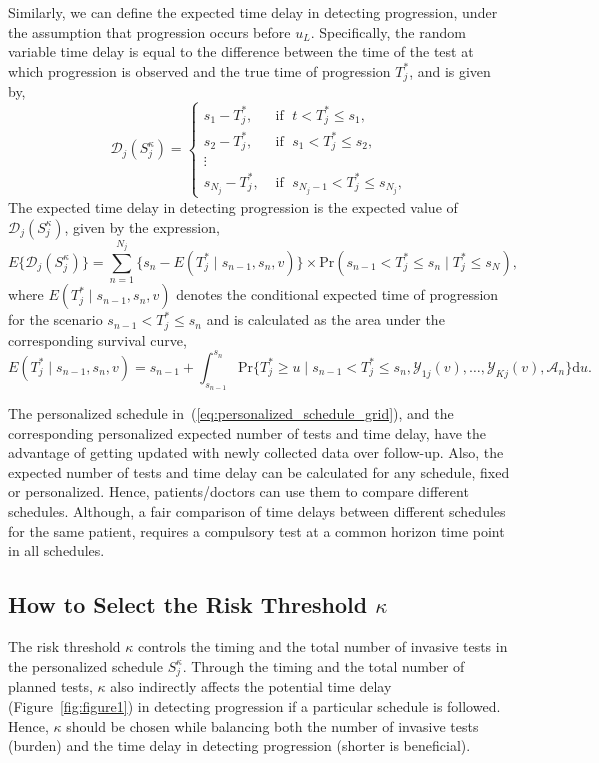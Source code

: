 \documentclass[AMA,STIX1COL]{WileyNJD-v2}
\begin{document}
Similarly, we can define the expected time delay in detecting progression, under the assumption that progression occurs before $u_L$. Specifically, the random variable time delay is equal to the difference between the time of the test at which progression is observed and the true time of progression $T_j^*$, and is given by,
\[
\mathcal D_j (S^\kappa_j) = \left \{
\begin{array}{ll}
s_1 - T_j^*, & \mbox{ if } \; t < T^*_j \leq s_1,\\
s_2 - T_j^*, & \mbox{ if } \; s_1 < T^*_j \leq s_2,\\
\vdots&\\
s_{N_j} - T_j^*, & \mbox{ if } \; s_{N_j-1} < T^*_j \leq s_{N_j},
\end{array}
\right.
\]
The expected time delay in detecting progression is the expected value of $\mathcal D_j (S^\kappa_j)$, given by the expression,
\begin{equation}
\label{eq:exp_delay}
E \big \{ \mathcal D_j(S^\kappa_j)\big\} = \sum_{n = 1}^{N_j} \Big\{s_n - E(T^*_j \mid s_{n-1}, s_n, v)\Big\} \times \mbox{Pr}(s_{n-1} < T^*_j \leq s_n\mid T^*_j \leq s_N),
\end{equation}
where $E(T^*_j \mid s_{n-1}, s_n, v)$ denotes the conditional expected time of progression for the scenario $s_{n-1} < T^*_j \leq s_n$ and is calculated as the area under the corresponding survival curve,
\begin{equation*}
E(T^*_j \mid s_{n-1}, s_n, v) = s_{n-1} + \int_{s_{n-1}}^{s_n} \mbox{Pr}\Big\{T^*_j \geq u \mid s_{n-1} < T^*_j \leq s_n, \mathcal{Y}_{1j}(v), \ldots, \mathcal{Y}_{Kj}(v), \mathcal{A}_n\Big\} \mathrm{d}u.
\end{equation*}

The personalized schedule in~(\ref{eq:personalized_schedule_grid}), and the corresponding personalized expected number of tests and time delay, have the advantage of getting updated with newly collected data over follow-up. Also, the expected number of tests and time delay can be calculated for any schedule, fixed or personalized. Hence, patients/doctors can use them to compare different schedules. Although, a fair comparison of time delays between different schedules for the same patient, requires a compulsory test at a common horizon time point in all schedules.

\subsection{How to Select the Risk Threshold $\kappa$}
\label{subsec:kappa_selection}
The risk threshold $\kappa$ controls the timing and the total number of invasive tests in the personalized schedule $S^\kappa_j$. Through the timing and the total number of planned tests, $\kappa$ also indirectly affects the potential time delay (Figure~\ref{fig:figure1}) in detecting progression if a particular schedule is followed. Hence, $\kappa$ should be chosen while balancing both the number of invasive tests (burden) and the time delay in detecting progression (shorter is beneficial).
\end{document}
